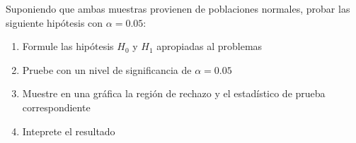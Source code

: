 \documentclass[addpoints]{exam}
\theoremstyle{mytheor}
\begin{document}
\begin{questions}
Suponiendo que ambas muestras provienen de poblaciones normales, probar las siguiente hipótesis con $\alpha = 0.05$:

\begin{enumerate}
\item Formule las hipótesis $H_0$ y $H_1$ apropiadas al problemas
\item Pruebe con un nivel de significancia de $\alpha = 0.05$
\item Muestre en una gráfica la región de rechazo y el estadístico de prueba correspondiente
\item Inteprete el resultado
\end{enumerate}


\end{questions}
\end{document}
